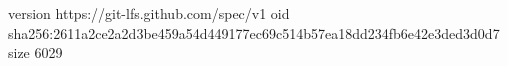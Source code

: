 version https://git-lfs.github.com/spec/v1
oid sha256:2611a2ce2a2d3be459a54d449177ec69c514b57ea18dd234fb6e42e3ded3d0d7
size 6029
